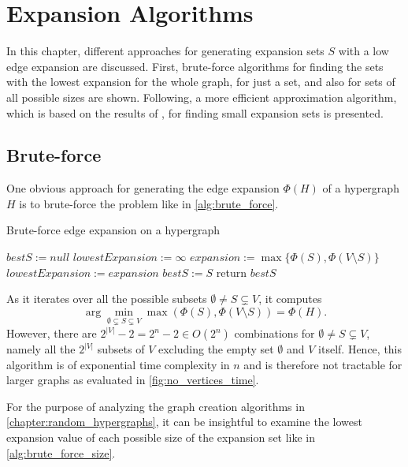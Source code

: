 \chapter{Expansion Algorithms}\label{chapter:algorithms}
In this chapter, different approaches for generating expansion sets $S$ with a low edge expansion are discussed. First, brute-force algorithms for finding the sets with the lowest expansion for the whole graph, %
for just a set,  %
and also for sets of all possible sizes  %
are shown. Following, a more efficient approximation algorithm, which is based on the results of \cite{ChanLTZ16}, for finding small expansion sets is presented.
\section{Brute-force}
One obvious approach for generating the edge expansion $\Phi(H)$ of a hypergraph $H$ is to brute-force the problem like in \cref{alg:brute_force}.
\begin{algorithm}[H]
	\caption{Brute-force edge expansion on a hypergraph \label{alg:brute_force}}
	\begin{algorithmic}
		\State $bestS := null$
		\State $lowestExpansion := \infty$
		\State $expansion :=  \max\{ \Phi(S), \Phi({V\setminus S})\}$
			\State $lowestExpansion := expansion$
			\State $bestS := S$
		\EndIf
		\EndFor	
		\State return $bestS$
		\EndFunction
	\end{algorithmic}
\end{algorithm}
As it iterates over all the possible subsets $\emptyset \neq S \subsetneq V$, it computes \begin{equation}
\arg\min_{\emptyset \subsetneq S \subsetneq V} \max{( \Phi(S), \Phi({V\setminus S}))} = \Phi(H).
\end{equation}
However, there are $2^{|V|}-2 = 2^{n}-2 \in O(2^n) $ combinations for $\emptyset \neq S \subsetneq V$, namely all the $2^{|V|}$ subsets of $V$ excluding the empty set $\emptyset$ and $V$ itself. Hence, this algorithm is of exponential time complexity in $n$ and is therefore not tractable for larger graphs as evaluated in \cref{fig:no_vertices_time}.

For the purpose of analyzing the graph creation algorithms in \cref{chapter:random_hypergraphs}, it can be insightful to examine the lowest expansion value of each possible size of the expansion set like in \cref{alg:brute_force_size}.

